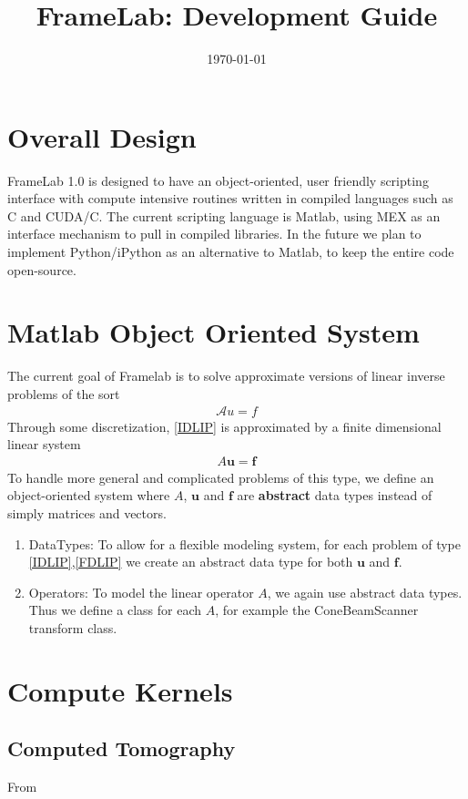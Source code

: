 \documentclass[12pt]{article}
\title{FrameLab: Development Guide}
\date{\today}
\begin{document}
\maketitle

\section{Overall Design}
FrameLab 1.0 is designed to have an object-oriented, user friendly scripting interface with compute intensive routines written in compiled languages such as C and CUDA/C.  The current scripting language is Matlab, using MEX as an interface mechanism to pull in compiled libraries.  In the future we plan to implement Python/iPython as an alternative to Matlab, to keep the entire code open-source.

\section{Matlab Object Oriented System}
The current goal of Framelab is to solve approximate versions of linear inverse problems of the sort 
\begin{align}
\mathcal{A}u = f \label{IDLIP}
\end{align}Through some discretization, \eqref{IDLIP} is approximated by a finite dimensional linear system 
\begin{align}
A\textbf{u} = \textbf{f}\label{FDLIP}
\end{align}To handle more general and complicated problems of this type, we define an object-oriented system where $A$, $\textbf{u}$ and $\textbf{f}$ are \textbf{abstract} data types instead of simply matrices and vectors.  
\begin{enumerate}
\item DataTypes: To allow for a flexible modeling system, for each problem of type \eqref{IDLIP},\eqref{FDLIP} we create an abstract data type for both $\textbf{u}$ and $\textbf{f}$.  
\item Operators: To model the linear operator $A$, we again use abstract data types.  Thus we define a class for each $A$, for example the ConeBeamScanner transform class.
\end{enumerate}




\section{Compute Kernels}
\subsection{Computed Tomography}
From \cite{gaocode}
\end{document}
